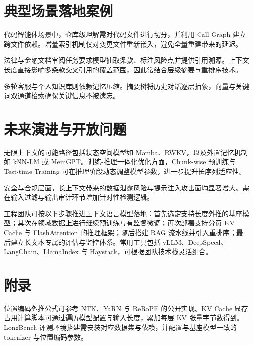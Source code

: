 \chapter{典型场景落地案例}
代码智能体场景中，仓库级理解需对代码文件进行切分，并利用 Call Graph 建立跨文件依赖。增量索引机制仅对变更文件重新嵌入，避免全量重建带来的延迟。\par
法律与金融文档审阅任务要求模型抽取条款、标注风险点并提供引用溯源。上下文长度直接影响多条款交叉引用的覆盖范围，因此常结合层级摘要与重排序技术。\par
多轮客服与个人知识库则依赖记忆压缩。摘要树将历史对话逐层抽象，向量与关键词双通道检索确保关键信息不被遗忘。\par
\chapter{未来演进与开放问题}
无限上下文的可能路径包括状态空间模型如 Mamba、RWKV，以及外置记忆机制如 kNN-LM 或 MemGPT。训练-推理一体化优化方面，Chunk-wise 预训练与 Test-time Training 可在推理阶段动态调整模型参数，进一步提升长序列适应性。\par
安全与合规层面，长上下文带来的数据泄露风险与提示注入攻击面均显著增大。需在输入过滤与输出审计环节增加针对性检测逻辑。\par
工程团队可按以下步骤推进上下文语言模型落地：首先选定支持长度外推的基座模型；其次在领域数据上进行继续预训练与有监督微调；再次部署支持分页 KV Cache 与 FlashAttention 的推理框架；随后搭建 RAG 流水线并引入重排序；最后建立长文本专属的评估与监控体系。常用工具包括 vLLM、DeepSpeed、LangChain、LlamaIndex 与 Haystack，可根据团队技术栈灵活组合。\par
\chapter{附录}
位置编码外推公式可参考 NTK、YaRN 与 ReRoPE 的公开实现。KV Cache 显存占用计算脚本可通过遍历模型配置与输入长度，累加每层 KV 张量字节数得到。LongBench 评测环境搭建需安装对应数据集与依赖，并配置与基座模型一致的 tokenizer 与位置编码参数。\par
